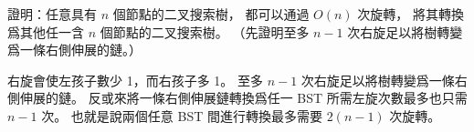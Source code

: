 \startEXERCISE
證明：任意具有 $n$ 個節點的二叉搜索樹，
都可以通過 $O(n)$ 次旋轉，
將其轉換爲其他任一含 $n$ 個節點的二叉搜索樹。
（\hint 先證明至多 $n-1$ 次右旋足以將樹轉變爲一條右側伸展的鏈。）
\stopEXERCISE

\startANSWER
右旋會使左孩子數少 1，而右孩子多 1。
至多 $n-1$ 次右旋足以將樹轉變爲一條右側伸展的鏈。
反或來將一條右側伸展鏈轉換爲任一 BST 所需左旋次數最多也只需 $n-1$ 次。
也就是說兩個任意 BST 間進行轉換最多需要 $2(n-1)$ 次旋轉。
\stopANSWER
